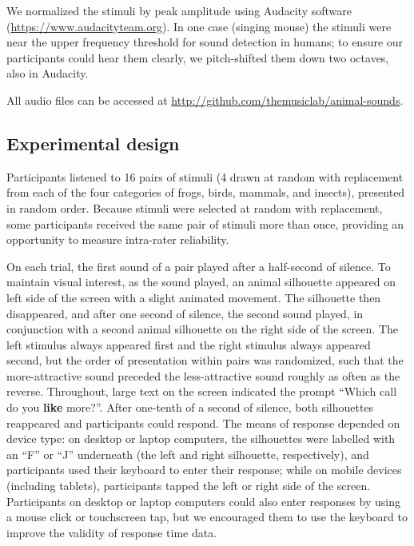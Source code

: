 \documentclass[
]{article}
\begin{document}
We normalized the stimuli by peak amplitude using Audacity software
(\url{https://www.audacityteam.org}). In one case (singing mouse) the
stimuli were near the upper frequency threshold for sound detection in
humans; to ensure our participants could hear them clearly, we
pitch-shifted them down two octaves, also in Audacity.

All audio files can be accessed at
\url{http://github.com/themusiclab/animal-sounds}.

\subsection{Experimental design}\label{experimental-design}

Participants listened to 16 pairs of stimuli (4 drawn at random with
replacement from each of the four categories of frogs, birds, mammals,
and insects), presented in random order. Because stimuli were selected
at random with replacement, some participants received the same pair of
stimuli more than once, providing an opportunity to measure intra-rater
reliability.

On each trial, the first sound of a pair played after a half-second of
silence. To maintain visual interest, as the sound played, an animal
silhouette appeared on left side of the screen with a slight animated
movement. The silhouette then disappeared, and after one second of
silence, the second sound played, in conjunction with a second animal
silhouette on the right side of the screen. The left stimulus always
appeared first and the right stimulus always appeared second, but the
order of presentation within pairs was randomized, such that the
more-attractive sound preceded the less-attractive sound roughly as
often as the reverse. Throughout, large text on the screen indicated the
prompt ``Which call do you \textbf{like} more?''. After one-tenth of a
second of silence, both silhouettes reappeared and participants could
respond. The means of response depended on device type: on desktop or
laptop computers, the silhouettes were labelled with an ``F'' or ``J''
underneath (the left and right silhouette, respectively), and
participants used their keyboard to enter their response; while on
mobile devices (including tablets), participants tapped the left or
right side of the screen. Participants on desktop or laptop computers
could also enter responses by using a mouse click or touchscreen tap,
but we encouraged them to use the keyboard to improve the validity of
response time data.
\end{document}
